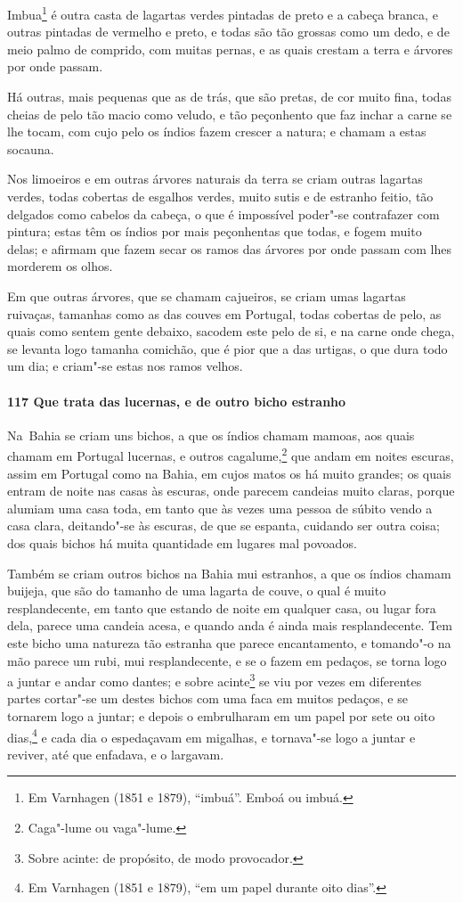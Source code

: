 Imbua\footnote{ Em Varnhagen (1851 e 1879), ``imbuá''. Emboá ou imbuá.} é outra casta de
lagartas verdes pintadas de preto e a cabeça branca, e outras pintadas de vermelho e
preto, e todas são tão grossas como um dedo, e de meio palmo de comprido, com muitas
pernas, e as quais crestam a terra e árvores por onde passam.

Há outras, mais pequenas que as de trás, que são pretas, de cor muito fina, todas cheias
de pelo tão macio como veludo, e tão peçonhento que faz inchar a carne se lhe tocam, com
cujo pelo os índios fazem crescer a natura; e chamam a estas socauna.

Nos limoeiros e em outras árvores naturais da terra se criam outras lagartas verdes, todas
cobertas de esgalhos verdes, muito sutis e de estranho feitio, tão delgados como cabelos
da cabeça, o que é impossível poder"-se contrafazer com pintura; estas têm os índios por
mais peçonhentas que todas, e fogem muito delas; e afirmam que fazem secar os ramos das
árvores por onde passam com lhes morderem os olhos.

Em que outras árvores, que se chamam cajueiros, se criam umas lagartas ruivaças, tamanhas
como as das couves em Portugal, todas cobertas de pelo, as quais como sentem gente
debaixo, sacodem este pelo de si, e na carne onde chega, se levanta logo tamanha comichão,
que é pior que a das urtigas, o que dura todo um dia; e criam"-se estas nos ramos velhos.

\paragraph{117 Que trata das lucernas, e de outro bicho estranho}

\mbox{Na Bahia} se criam uns bichos, a que os índios chamam mamoas, aos quais chamam em Portugal
lucernas, e outros cagalume,\footnote{ Caga"-lume ou vaga"-lume.} que andam em noites
escuras, assim em Portugal como na Bahia, em cujos matos os há muito grandes; os quais
entram de noite nas casas às escuras, onde parecem candeias muito claras, porque alumiam
uma casa toda, em tanto que às vezes uma pessoa de súbito vendo a casa clara, deitando"-se
às escuras, de que se espanta, cuidando ser outra coisa; dos quais bichos há muita
quantidade em lugares mal povoados.

Também se criam outros bichos na Bahia mui estranhos, a que os índios chamam buijeja, que
são do tamanho de uma lagarta de couve, o qual é muito resplandecente, em tanto que
estando de noite em qualquer casa, ou lugar fora dela, parece uma candeia acesa, e quando
anda é ainda mais resplandecente. Tem este bicho uma natureza tão estranha que parece
encantamento, e tomando"-o na mão parece um rubi, mui resplandecente, e se o fazem em
pedaços, se torna logo a juntar e andar como dantes; e sobre acinte\footnote{ Sobre
acinte: de propósito, de modo provocador.} se viu por vezes em diferentes partes 
cortar"-se um destes bichos com uma faca em muitos pedaços, e se tornarem logo a
juntar; e depois o embrulharam em um papel por sete ou oito dias,\footnote{ Em Varnhagen
(1851 e 1879), ``em um papel durante oito dias''.} e cada dia o espedaçavam em migalhas, e
tornava"-se logo a juntar e reviver, até que enfadava, e o largavam.

